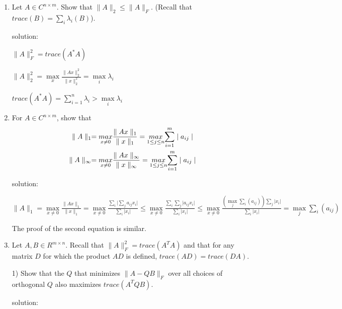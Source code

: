 \documentclass{article}
\begin{document}
\begin{enumerate}
		\item%
		Let $A \in C^{n \times m}$. Show that $\parallel A \parallel_2 \leq \parallel A \parallel_F$. (Recall that $trace(B)=\sum_i\lambda_i(B)$).
		
		solution:$ $
		
		$\parallel A\parallel _F^2=trace(A^*A)$
		
		$\parallel A\parallel _2^2=\max \limits_{x}\frac{\parallel Ax\parallel _2^2}{\parallel x\parallel _2^2}= \max \limits_{i}\lambda _i$
		
		$trace(A^*A)=\sum_{i=1}^n{\lambda _i}> \max \limits_{i}\lambda _i$
		
		\item%
		For  $A \in C^{n \times m}$, show that
		\begin{gather}
			\setcounter{equation}{0}
			\parallel A \parallel_1 = \underset{x \neq 0}{max}\frac{\parallel Ax \parallel_1}{\parallel x \parallel_1} = \underset{1 \le j \le n}{max}{\sum_{i = 1}^{m} \mid a_{ij} \mid} \\
			\parallel A \parallel_\infty = \underset{x \neq 0}{max}\frac{\parallel Ax \parallel_\infty}{\parallel x \parallel_\infty} = \underset{1 \le j \le n}{max}{\sum_{i = 1}^{m} \mid a_{ij} \mid}
		\end{gather}
	
	    solution:$ $%
	    
	    $\parallel A \parallel_1
	    = \max \limits_{x\neq 0}\frac{\parallel Ax \parallel_1}{\parallel x \parallel_1}
	    = \max \limits_{x\neq 0}\frac{\sum _i \lvert \sum _j a_{ij}x_i \rvert}
	                                 {\sum _i \lvert x_i \rvert }
	 \leq \max \limits_{x\neq 0}\frac{\sum _i \sum _j \lvert a_{ij}x_i \rvert}
	                                 {\sum _i \lvert x_i \rvert }
	 \leq \max \limits_{x\neq 0}\frac{(\max \limits_{j}\sum _i(a_{ij})) \sum _j \lvert x_i \rvert
	 }{\sum _i \lvert x_i \rvert }
     =\max \limits_{j}\sum _i(a_{ij}) $
	    
	    The proof of the second equation is similar.
		
		\item%
		Let $A, B \in R^{m \times n}$. Recall that $\parallel A \parallel_F^2 = trace(A^TA)$ and that for any matrix $D$ for which the product $AD$ is defined, $trace(AD)=trace(DA)$.
		
		1) Show that the $Q$ that minimizes $\parallel A - QB \parallel_F$ over all choices of orthogonal $Q$ also maximizes $trace(A^TQB)$.
		
		solution:$ $%
		

\end{enumerate}
\end{document}
